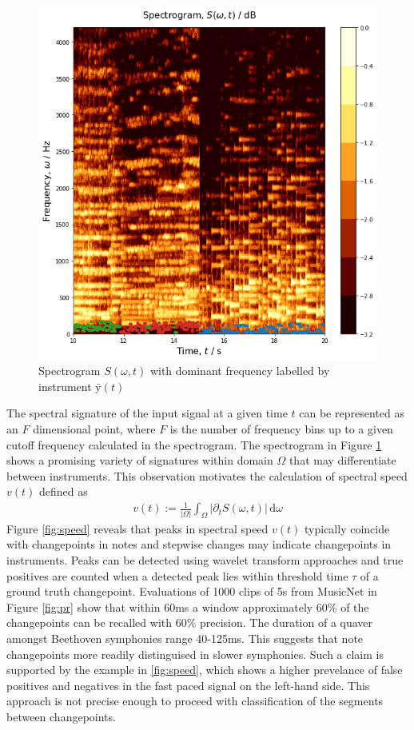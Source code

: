 \documentclass{article}[12pt]
\numberwithin{equation}{section}
\begin{document}
\begin{figure}[H]
\centering{}
\captionsetup{justification=centering}
\includegraphics[scale=0.5]{spectrogram}
\caption{
Spectrogram $S(\omega,t)$ with dominant frequency labelled by instrument $\bar{\mathrm{y}}(t)$
}
\label{fig:spectrogram}
\end{figure}\noindent
The spectral signature of the input signal at a given time $t$ can be
represented as an $F$ dimensional point, where $F$ is the number
of frequency bins up to a given cutoff frequency calculated in the
spectrogram. The spectrogram in Figure \ref{fig:spectrogram} shows a
promising variety of signatures within domain $\Omega$ that may differentiate between instruments.
This observation motivates the calculation of spectral speed $v(t)$ defined as
\begin{align}
	v(t):= \frac{1}{|\Omega|}\int_{\Omega}\!\big|\partial_tS(\omega,t)\big|\,\mathrm{d}\omega
\end{align}
Figure \ref{fig:speed} reveals that peaks in spectral speed $v(t)$ typically
coincide with changepoints in notes and stepwise changes may indicate changepoints
in instruments. Peaks can be detected using wavelet transform approaches \cite{Du2006}
and true positives are counted when a detected peak lies within threshold time $\tau$
of a ground truth changepoint. Evaluations of 1000 clips of 5s from MusicNet
in Figure \ref{fig:pr} show that within 60ms a window approximately 60\% of the changepoints can be recalled with 60\% precision.
The duration of a quaver amongst Beethoven symphonies range 40-125ms. This suggests
that note changepoints more readily distinguised in slower symphonies. Such a claim
is supported by the example in \ref{fig:speed}, which shows a higher prevelance of
false positives and negatives in the fast paced signal on the left-hand side.
This approach is not precise enough to proceed with classification of the
segments between changepoints.
\end{document}
